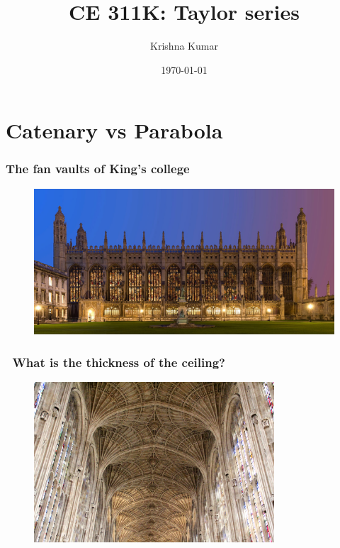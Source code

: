 \documentclass[notes]{beamer}
\title[CE 311K: Taylor series]{CE 311K: Taylor series}
\author{Krishna Kumar} %
\institute[UT Austin] %
{
University of Texas at Austin \\
\medskip
\href{mailto:krishnak@utexas.edu}{krishnak@utexas.edu} %
}
\date{\today} %
\begin{document}
\begin{frame}
\titlepage %
\end{frame}

\newif\ifshowtoc
\showtoctrue%

\AtBeginSection{%
	\ifshowtoc
	\begin{frame}
		\tableofcontents[currentsection, subsectionstyle=show/show/hide]
	\end{frame}
	\fi
}


\section{Catenary vs Parabola}
\begin{frame}
	\frametitle{The fan vaults of King's college}
	\begin{figure}[ht]
		\centering
		\includegraphics[width=\textwidth]{figs/kings.jpg}
	\end{figure}
\end{frame}


\begin{frame}
	\frametitle{\faQuestionCircleO~What is the thickness of the ceiling?}
	\begin{figure}[ht]
		\centering
		\includegraphics[width=0.8\textwidth]{figs/fanvaults.jpg}
	\end{figure}
\end{frame}
\end{document}
